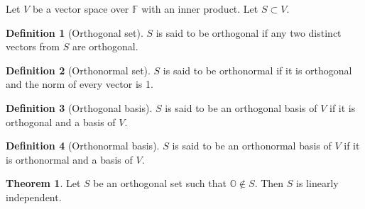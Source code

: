 \documentclass[fleqn, a4paper, 12pt]{article}
\theoremstyle{definition}
\newtheorem{definition}{Definition} %
\theoremstyle{theorem}
\newtheorem{theorem}{Theorem} %
\theoremstyle{remark}
\numberwithin{corollary}{theorem}
\numberwithin{equation}{theorem}
\begin{document}
Let $V$ be a vector space over $\mathbb{F}$ with an inner product. Let $S \subset V$.

\begin{definition}[Orthogonal set]
	$S$ is said to be orthogonal if any two distinct vectors from $S$ are orthogonal.
\end{definition}

\begin{definition}[Orthonormal set]
	$S$ is said to be orthonormal if it is orthogonal and the norm of every vector is 1.
\end{definition}

\begin{definition}[Orthogonal basis]
	$S$ is said to be an orthogonal basis of $V$ if it is orthogonal and a basis of $V$.
\end{definition}

\begin{definition}[Orthonormal basis]
	$S$ is said to be an orthonormal basis of $V$ if it is orthonormal and a basis of $V$.
\end{definition}

\begin{theorem}
	Let $S$ be an orthogonal set such that $\mathbb{O} \notin S$. Then $S$ is linearly independent.
\end{theorem}
\end{document}
